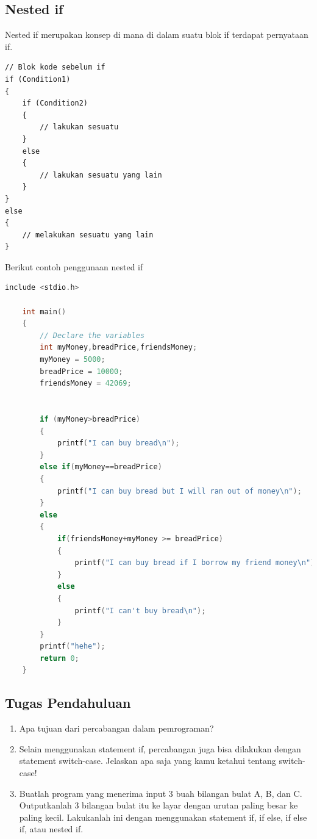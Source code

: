 \subsection{Nested if}
Nested if merupakan konsep di mana di dalam suatu blok if terdapat pernyataan if.
\begin{verbatim}
// Blok kode sebelum if
if (Condition1)
{
    if (Condition2)
    {
        // lakukan sesuatu
    }
    else
    {
        // lakukan sesuatu yang lain
    }
} 
else
{
    // melakukan sesuatu yang lain
}
\end{verbatim}

Berikut contoh penggunaan nested if

\begin{lstlisting}[language=c,caption = Contoh nested if,label=lst:nestedifexample01]
	include <stdio.h>
	
	int main()
	{
		// Declare the variables
		int myMoney,breadPrice,friendsMoney;
		myMoney = 5000;
		breadPrice = 10000;
		friendsMoney = 42069;
		
		
		if (myMoney>breadPrice)
		{
		    printf("I can buy bread\n");
		}
		else if(myMoney==breadPrice)
		{
		    printf("I can buy bread but I will ran out of money\n");
		}
		else
		{
		    if(friendsMoney+myMoney >= breadPrice)
		    {
		        printf("I can buy bread if I borrow my friend money\n"); 
		    }
		    else
		    {
	            printf("I can't buy bread\n");	
		    }
		}
		printf("hehe");
		return 0;
	}
\end{lstlisting}


\subsection{Tugas Pendahuluan}
\begin{enumerate}
	\item Apa tujuan dari percabangan dalam pemrograman?
	\item Selain menggunakan statement if, percabangan juga bisa dilakukan dengan statement switch-case. Jelaskan apa saja yang kamu ketahui tentang switch-case!
	\item Buatlah program yang menerima input 3 buah bilangan bulat A, B, dan C. Outputkanlah 3 bilangan bulat itu ke layar dengan urutan paling besar ke paling kecil. Lakukanlah ini dengan menggunakan statement if, if else, if else if, atau nested if.
\end{enumerate}

